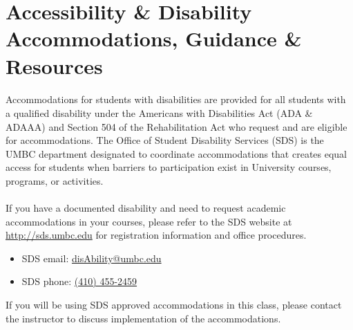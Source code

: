 \documentclass[letter,10pt]{article}
\begin{document}

\section*{Accessibility \& Disability Accommodations, Guidance \& Resources}
\paragraph{}Accommodations for students with disabilities are provided for all students with a qualified disability under the Americans with Disabilities Act (ADA \& ADAAA) and Section 504 of the Rehabilitation Act who request and are eligible for accommodations. The Office of Student Disability Services (SDS) is the UMBC department designated to coordinate accommodations that creates equal access for students when barriers to participation exist in University courses, programs, or activities.

\paragraph{}If you have a documented disability and need to request academic accommodations in your courses, please refer to the SDS website at \url{http://sds.umbc.edu} for registration information and office procedures.
\begin{itemize}
\item SDS email: \href{mailto:disAbility@umbc.edu}{disAbility@umbc.edu}
\item SDS phone: \href{tel:+14104552459}{(410) 455-2459}
\end{itemize}
If you will be using SDS approved accommodations in this class, please contact the instructor to discuss implementation of the accommodations. 
\end{document}
